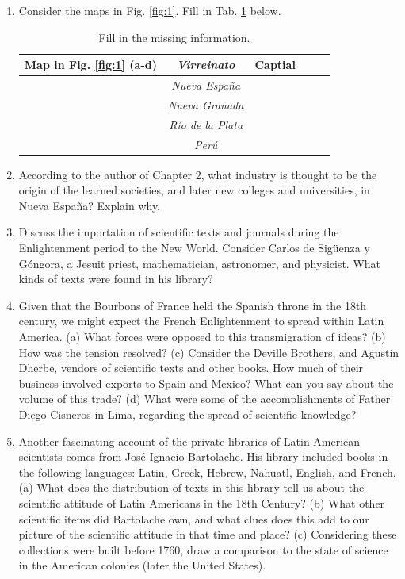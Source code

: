 \documentclass[12pt]{article}
\begin{document}
\begin{enumerate}
\item Consider the maps in Fig. \ref{fig:1}.  Fill in Tab. \ref{tab:1} below.
\begin{table}[ht]
\centering
\begin{tabular}{| c | c | c |}
\hline
\textbf{Map in Fig. \ref{fig:1}} (a-d) & \textbf{\textit{Virreinato}} & Captial $~~~~~~~~~~$ \\ \hline
& \textit{Nueva Espa\~{n}a} & $~~~~~~~~~~$ \\ \hline
& \textit{Nueva Granada} & $~~~~~~~~~~$ \\ \hline
& \textit{R\'{i}o de la Plata} & $~~~~~~~~~~$ \\ \hline
& \textit{Per\'{u}} & $~~~~~~~~~~$ \\ \hline
\end{tabular}
\caption{\label{tab:1} Fill in the missing information.}
\end{table}
\item According to the author of Chapter 2, what industry is thought to be the origin of the learned societies, and later new colleges and universities, in Nueva Espa\~{n}a? Explain why.  \\ \vspace{1.5cm}
\item Discuss the importation of scientific texts and journals during the Enlightenment period to the New World.  Consider Carlos de Sig\"{u}enza y G\'{o}ngora, a Jesuit priest, mathematician, astronomer, and physicist.  What kinds of texts were found in his library? \\ \vspace{3cm}
\item Given that the Bourbons of France held the Spanish throne in the 18th century, we might expect the French Enlightenment to spread within Latin America. (a) What forces were opposed to this transmigration of ideas?  (b) How was the tension resolved? (c) Consider the Deville Brothers, and Agust\'{i}n Dherbe, vendors of scientific texts and other books. How much of their business involved exports to Spain and Mexico?  What can you say about the volume of this trade? (d) What were some of the accomplishments of Father Diego Cisneros in Lima, regarding the spread of scientific knowledge? \\ \vspace{3cm}
\item Another fascinating account of the private libraries of Latin American scientists comes from Jos\'{e} Ignacio Bartolache.  His library included books in the following languages: Latin, Greek, Hebrew, Nahuatl, English, and French.  (a) What does the distribution of texts in this library tell us about the scientific attitude of Latin Americans in the 18th Century? (b) What other scientific items did Bartolache own, and what clues does this add to our picture of the scientific attitude in that time and place?  (c) Considering these collections were built before 1760, draw a comparison to the state of science in the American colonies (later the United States).
\end{enumerate}
\end{document}
